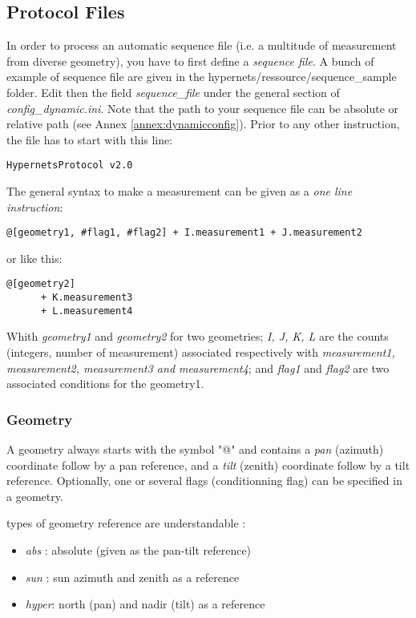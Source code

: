 \subsection{Protocol Files}
In order to process an automatic sequence file (i.e. a multitude of measurement
from diverse geometry), you have to first define a \textit{sequence file}. A
bunch of example of sequence file are given in the hypernets/ressource/sequence\_sample 
folder. Edit then the field \textit{sequence\_file} under the general section
of \textit{config\_dynamic.ini}. Note that the path to your sequence
file can be absolute or relative path (see Annex \ref{annex:dynamicconfig}).
\noindent Prior to any other instruction, the file has to start with this line:
\vspace{-10pt}
\begin{lstlisting}
HypernetsProtocol v2.0
\end{lstlisting}
\vspace{-6pt}
\noindent The general syntax to make a measurement can be given as a
\textit{one line instruction}:
\vspace{-10pt}
\begin{lstlisting}
@[geometry1, #flag1, #flag2] + I.measurement1 + J.measurement2
\end{lstlisting}
\vspace{-6pt}
or like this:
\vspace{-10pt}
\begin{lstlisting}
@[geometry2] 
      + K.measurement3 
	  + L.measurement4
\end{lstlisting}

\noindent Whith \textit{geometry1} and \textit{geometry2} for two geometries;
\textit{I, J, K, L} are the counts (integers, number of measurement) 
associated respectively with \textit{measurement1, measurement2, measurement3
and measurement4};
and \textit{flag1} and \textit{flag2} are two associated conditions for the
geometry1.

\subsubsection{Geometry}
A geometry always starts with the symbol "@" and contains a \textit{pan
} (azimuth) coordinate follow by a pan reference, and a \textit{tilt} (zenith) 
coordinate follow by a tilt reference. Optionally, one or several flags 
(conditionning flag) can be specified in a geometry.

\vspace{10pt}
 types of geometry reference are understandable :
\begin{itemize}
	\item \textit{abs}  : absolute (given as the pan-tilt reference)
	\item \textit{sun}  : sun azimuth and zenith as a reference
	\item \textit{hyper}: north (pan) and nadir (tilt) as a reference 
\end{itemize}

